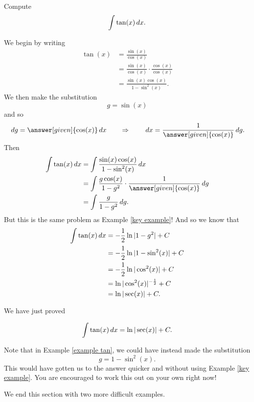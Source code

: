 \documentclass{ximera}
\begin{document}

\begin{example}\label{example tan}
Compute
\[
\int \tan(x) \,d x.
\]
\begin{explanation}
We begin by writing
\begin{align*}
\tan(x) &= \frac{\sin(x)}{\cos(x)}  \\
&= \frac{\sin(x)}{\cos(x)} \cdot \frac{\cos(x)}{\cos(x)}  \\
&= \frac{\sin(x) \cos(x)}{1 - \sin^2(x)}.
\end{align*}
We then make the substitution
\[
g = \sin(x)
\]
and so
\[
\d g = \answer[given]{\cos(x)} \d x 	\qquad	\Rightarrow	\qquad	\d x = \frac{1}{\answer[given]{\cos(x)}} \d g.
\]
Then
\begin{align*}
\int \tan(x) \d x &= \int \frac{\sin(x) \cos(x)}{1 - \sin^2(x)} \d x  \\
&= \int \frac{g \cos(x)}{1 - g^2} \cdot \frac{1}{\answer[given]{\cos(x)}} \d g  \\
&= \int \frac{g}{1-g^2} \d g.
\end{align*}
But this is the same problem as Example \ref{key example}!  
And so we know that
\begin{align*}
\int \tan(x) \,d x &= - \frac{1}{2} \ln|1-g^2| + C  \\
&= - \frac{1}{2} \ln|1-\sin^2 (x)| + C  \\
&= - \frac{1}{2} \ln|\cos^2(x)| + C  \\
&= \ln|\cos^2(x)|^{- \frac{1}{2}} + C  \\
&= \ln|\sec(x)| + C.
\end{align*}
\end{explanation}
\end{example}

We have just proved

\begin{theorem}
\[
\int \tan(x) \,d x = \ln|\sec(x)| + C.
\]
\end{theorem}

Note that in Example \ref{example tan}, we could have instead made the substitution
\[
g = 1-\sin^2(x).
\]
This would have gotten us to the answer quicker and without using Example \ref{key example}.  
You are encouraged to work this out on your own right now!

We end this section with two more difficult examples.
\end{document}
